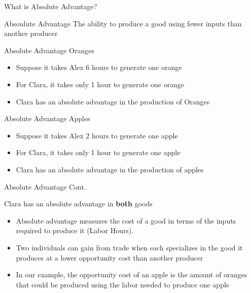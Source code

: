 \documentclass{beamer}
\begin{document}
\begin{frame}{What is Absolute Advantage?}
\begin{block}{Absoulute Advantage}
The ability to produce a good using fewer inputs than another producer
\end{block}

\begin{exampleblock}{Absolute Advantage Oranges}
\begin{itemize}
\item Suppose it takes Alex 6 hours to generate one orange
\item For Clara, it takes only 1 hour to generate one orange
\item Clara has an absolute advantage in the production of Oranges
\end{itemize}
\end{exampleblock}

\begin{exampleblock}{Absolute Advantage Apples}
\begin{itemize}
\item Suppose it takes Alex 2 hours to generate one apple
\item For Clara, it takes only 1 hour to generate one apple
\item Clara has an absolute advantage in the production of apples
\end{itemize}


\end{exampleblock}

\end{frame}

\begin{frame}{Absolute Advantage Cont.}

Clara has an absolute advantage in \textbf{both} goods

\begin{itemize}
\item Absolute advantage measures the cost of a good in terms of the inputs required to produce it (Labor Hours).

\item Two individuals can gain from trade when each specializes in the good it produces at a lower opportunity cost than another producer

\item In our example, the opportunity cost of an apple is the amount of oranges that could be produced using the labor needed to produce one apple

\end{itemize}
\end{frame}
\end{document}
